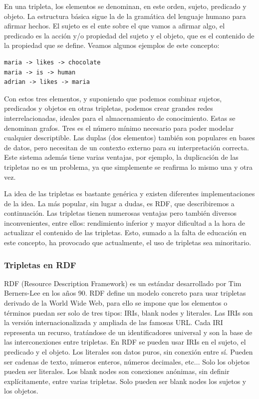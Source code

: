 \documentclass[12pt]{report} %
\begin{document}
En una tripleta, los elementos se denominan, en este orden, sujeto, predicado y objeto. La estructura básica sigue la de la gramática del lenguaje humano para afirmar hechos.
El sujeto es el ente sobre el que vamos a afirmar algo, el predicado es la acción y/o propiedad del sujeto y el objeto, que es el contenido de la propiedad que se define.
Veamos algunos ejemplos de este concepto:
\begin{verbatim}
maria -> likes -> chocolate
maria -> is -> human
adrian -> likes -> maria
\end{verbatim}
Con estos tres elementos, y suponiendo que podemos combinar sujetos, predicados y objetos en otras tripletas, podemos crear grandes redes interrelacionadas, ideales para el almacenamiento de conocimiento.
Estas se denominan grafos.
Tres es el número mínimo necesario para poder modelar cualquier descriptible. Las duplas (dos elementos) también son populares en bases de datos, pero necesitan de un contexto externo para su interpretación correcta.
Este sistema además tiene varias ventajas, por ejemplo, la duplicación de las tripletas no es un problema, ya que simplemente se reafirma lo mismo una y otra vez.

La idea de las tripletas es bastante genérica y existen diferentes implementaciones de la idea. La más popular, sin lugar a dudas, es RDF, que describiremos a continuación.
Las tripletas tienen numerosas ventajas pero también diversos inconvenientes, entre ellos: rendimiento inferior y mayor dificultad a la hora de actualizar el contenido de las tripletas.
Esto, sumado a la falta de educación en este concepto, ha provocado que actualmente, el uso de tripletas sea minoritario.

\subsubsection{Tripletas en RDF}

RDF (Resource Description Framework) es un estándar desarrollado por Tim Berners-Lee en los años 90.
RDF define un modelo concreto para usar tripletas derivado de la World Wide Web, para ello se impone que los elementos o términos puedan ser solo de tres tipos: IRIs, blank nodes y literales.
Las IRIs son la versión internacionalizada y ampliada de las famosas URL. Cada IRI representa un recurso, tratándose de un identificadores universal y son la base de las interconexiones entre tripletas. En RDF se pueden usar IRIs en el sujeto, el predicado y el objeto.
Los literales son datos puros, sin conexión entre sí. Pueden ser cadenas de texto, números enteros, números decimales, etc... Solo los objetos pueden ser literales.
Los blank nodes son conexiones anónimas, sin definir explícitamente, entre varias tripletas. Solo pueden ser blank nodes los sujetos y los objetos.
\end{document}
